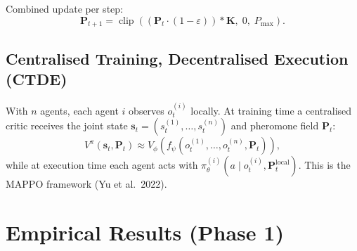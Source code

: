 \documentclass[11pt,a4paper]{article}
\newcommand{\policy}{\pi}
\newcommand{\clip}{\operatorname{clip}}
\begin{document}
Combined update per step:
\begin{equation}
  \mathbf{P}_{t+1} = \clip\!\left(
    \left(\mathbf{P}_t \cdot (1-\varepsilon)\right) * \mathbf{K},
    \; 0, \; P_{\max}
  \right).
  \label{eq:pheromone}
\end{equation}

\subsection{Centralised Training, Decentralised Execution (CTDE)}

With $n$ agents, each agent $i$ observes $o_t^{(i)}$ locally.
At training time a centralised critic receives the joint state
$\mathbf{s}_t = (s_t^{(1)}, \ldots, s_t^{(n)})$
and pheromone field $\mathbf{P}_t$:
\begin{equation}
  V^\pi(\mathbf{s}_t, \mathbf{P}_t) \approx V_\phi\!\left(
    f_\psi(o_t^{(1)}, \ldots, o_t^{(n)}, \mathbf{P}_t)
  \right),
\end{equation}
while at execution time each agent acts with
$\policy^{(i)}_\theta(a \mid o_t^{(i)}, \mathbf{P}_t^{\text{local}})$.
This is the MAPPO framework (Yu et al.\ 2022).

\section{Empirical Results (Phase 1)}
\end{document}
